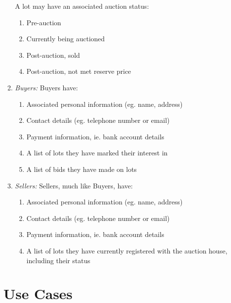 \documentclass[titlepage, 12pt]{extarticle}
\begin{document}
\begin{enumerate}
    A lot may have an associated auction status:
    \begin{enumerate}
      \item Pre-auction
      \item Currently being auctioned
      \item Post-auction, sold
      \item Post-auction, not met reserve price
    \end{enumerate}
\item {\it Buyers:} Buyers have:
  \begin{enumerate}
    \item Associated personal information (eg. name, address)
    \item Contact details (eg. telephone number or email)
    \item Payment information, ie. bank account details
    \item A list of lots they have marked their interest in
    \item A list of bids they have made on lots
  \end{enumerate}
\item {\it Sellers:} Sellers, much like Buyers, have:
  \begin{enumerate}
    \item Associated personal information (eg. name, address)
    \item Contact details (eg. telephone number or email)
    \item Payment information, ie. bank account details
    \item A list of lots they have currently registered with the auction house, including their status
  \end{enumerate}
\end{enumerate}

\section{Use Cases}
\end{document}
